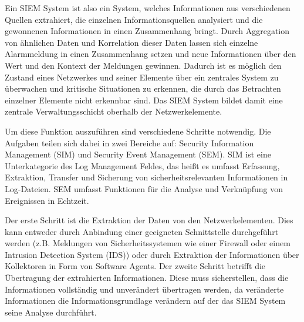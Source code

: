 Ein SIEM System ist also ein System, welches Informationen aus verschiedenen Quellen extrahiert, die einzelnen Informationsquellen analysiert und die gewonnenen Informationen in einen Zusammenhang bringt. Durch Aggregation von ähnlichen Daten und Korrelation dieser Daten lassen sich einzelne Alarmmeldung in einen Zusammenhang setzen und neue Informationen über den Wert und den Kontext der Meldungen gewinnen. Dadurch ist es möglich den Zustand eines Netzwerkes und seiner Elemente über ein zentrales System zu überwachen und kritische Situationen zu erkennen, die durch das Betrachten einzelner Elemente nicht erkennbar sind. Das SIEM System bildet damit eine zentrale Verwaltungsschicht oberhalb der Netzwerkelemente.

Um diese Funktion auszuführen sind verschiedene Schritte notwendig. Die Aufgaben teilen sich dabei in zwei Bereiche auf: Security Information Management (SIM) und Security Event Management (SEM). SIM ist eine Unterkategorie des Log Management Feldes, das heißt es umfasst Erfassung, Extraktion, Transfer und Sicherung von sicherheitsrelevanten Informationen in Log-Dateien. SEM umfasst Funktionen für die Analyse und Verknüpfung von Ereignissen in Echtzeit.

Der erste Schritt ist die Extraktion der Daten von den Netzwerkelementen. Dies kann entweder durch Anbindung einer geeigneten Schnittstelle durchgeführt werden (z.B. Meldungen von Sicherheitssystemen wie einer Firewall oder einem Intrusion Detection System (IDS)) oder durch Extraktion der Informationen über Kollektoren in Form von Software Agents. Der zweite Schritt betrifft die Übertragung der extrahierten Informationen. Diese muss sicherstellen, dass die Informationen vollständig und unverändert übertragen werden, da veränderte Informationen die Informationsgrundlage verändern auf der das SIEM System seine Analyse durchführt. 

